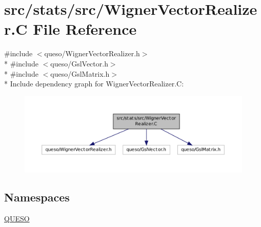 \hypertarget{_wigner_vector_realizer_8_c}{\section{src/stats/src/\-Wigner\-Vector\-Realizer.C File Reference}
\label{_wigner_vector_realizer_8_c}
}
{\ttfamily \#include $<$queso/\-Wigner\-Vector\-Realizer.\-h$>$}\\*
{\ttfamily \#include $<$queso/\-Gsl\-Vector.\-h$>$}\\*
{\ttfamily \#include $<$queso/\-Gsl\-Matrix.\-h$>$}\\*
Include dependency graph for Wigner\-Vector\-Realizer.\-C\-:
\nopagebreak
\begin{figure}[H]
\begin{center}
\leavevmode
\includegraphics[width=350pt]{_wigner_vector_realizer_8_c__incl}
\end{center}
\end{figure}
\subsection*{Namespaces}
\begin{DoxyCompactItemize}
\item 
\hyperlink{namespace_q_u_e_s_o}{Q\-U\-E\-S\-O}
\end{DoxyCompactItemize}
